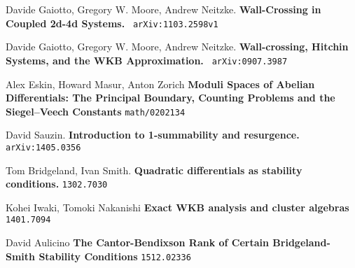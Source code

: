 \documentclass[12pt]{article}
\begin{document}
\newpage

\selectfont \fontsize{12}{10}\selectfont


\begin{thebibliography}{}

\item Davide Gaiotto, Gregory W. Moore, Andrew Neitzke. \textbf{Wall-Crossing in Coupled 2d-4d Systems.} \texttt{ arXiv:1103.2598v1}


\item Davide Gaiotto, Gregory W. Moore, Andrew Neitzke. \textbf{Wall-crossing, Hitchin Systems, and the WKB Approximation.} \texttt{ arXiv:0907.3987}

\end{thebibliography}

\vspace{0.25in}

\begin{thebibliography}{}

\item Alex Eskin, Howard Masur, Anton Zorich \textbf{Moduli Spaces of Abelian Differentials: The Principal Boundary, Counting Problems and the Siegel--Veech Constants} \texttt{math/0202134}

\item David Sauzin.	\textbf{ Introduction to 1-summability and resurgence. } \texttt{arXiv:1405.0356}

\item Tom Bridgeland, Ivan Smith.  \textbf{Quadratic differentials as stability conditions.} \texttt{1302.7030}

\item Kohei Iwaki, Tomoki Nakanishi \textbf{Exact WKB analysis and cluster algebras} \texttt{1401.7094}

\item David Aulicino \textbf{The Cantor-Bendixson Rank of Certain Bridgeland-Smith Stability Conditions} \texttt{1512.02336}

\end{thebibliography}
\end{document}
